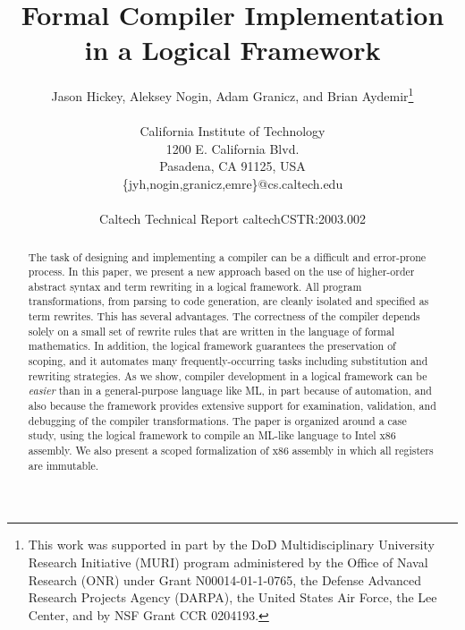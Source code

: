\documentclass[11pt]{article}
\begin{document}
\title{Formal Compiler Implementation in a Logical Framework}

\author{Jason Hickey, Aleksey Nogin, Adam Granicz, and Brian Aydemir\thanks{This
  work was supported in part by the DoD Multidisciplinary
  University Research Initiative (MURI) program administered by the
  Office of Naval Research (ONR) under Grant N00014-01-1-0765, the
  Defense Advanced Research Projects Agency (DARPA), the United States
  Air Force, the Lee Center, and by NSF Grant CCR 0204193.}\\
   \\
   California Institute of Technology\\
   1200 E. California Blvd.\\
   Pasadena, CA 91125, USA\\
   \{jyh,nogin,granicz,emre\}@cs.caltech.edu\\
   \\
   Caltech Technical Report caltechCSTR:2003.002}

\maketitle

\begin{abstract}
The task of designing and implementing a compiler can be a
difficult and error-prone process.  In this paper, we present a new
approach based on the use of higher-order abstract syntax and term
rewriting in a logical framework.  All program transformations, from
parsing to code generation, are cleanly isolated and specified as term
rewrites.  This has several advantages.  The correctness of the
compiler depends solely on a small set of rewrite rules that are
written in the language of formal mathematics.  In addition, the logical
framework guarantees the preservation of scoping, and it automates
many frequently-occurring tasks including substitution and rewriting
strategies.  As we show, compiler development in a logical framework
can be \emph{easier} than in a general-purpose language like ML, in
part because of automation, and also because the framework provides
extensive support for examination, validation, and debugging of the
compiler transformations.  The paper is organized around a case study,
using the \MetaPRL{} logical framework to compile an ML-like language to
Intel x86 assembly.  We also present a scoped formalization of x86
assembly in which all registers are immutable.

\end{abstract}

\sloppy






\printindex
\end{document}
